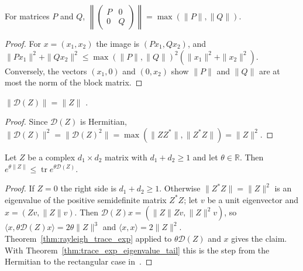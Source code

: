 \begin{theorem}
    \label{thm:block_diagonal_norm}
    \leanok
    For matrices $P$ and $Q$,
    $\left\|\begin{pmatrix}P&0\\0&Q\end{pmatrix}\right\|=\max(\|P\|,\|Q\|)$.
\end{theorem}
\begin{proof}\leanok
    For $x=(x_1,x_2)$ the image is $(Px_1,Qx_2)$, and
    $\|Px_1\|^{2}+\|Qx_2\|^{2}\le\max(\|P\|,\|Q\|)^{2}(\|x_1\|^{2}+\|x_2\|^{2})$.
    Conversely, the vectors $(x_1,0)$ and $(0,x_2)$ show $\|P\|$ and $\|Q\|$
    are at most the norm of the block matrix.
\end{proof}

\begin{theorem}
    \label{thm:hermitian_dilation_norm}
    \leanok
    $\|\mathcal{D}(Z)\|=\|Z\|$ \cite[Equation~(2.12)]{Tropp2012User}.
\end{theorem}
\begin{proof}\leanok
    Since $\mathcal{D}(Z)$ is Hermitian,
    $\|\mathcal{D}(Z)\|^{2}=\|\mathcal{D}(Z)^{2}\|=\max(\|ZZ^{*}\|,\|Z^{*}Z\|)
        =\|Z\|^{2}$.
\end{proof}

\begin{theorem}
    \label{thm:hermitian_dilation_trace_exp}
    \leanok
    Let $Z$ be a complex $d_1\times d_2$ matrix with $d_1+d_2\ge1$ and let
    $\theta\in\mathbb{R}$. Then
    $e^{\theta\|Z\|}\le\operatorname{tr}e^{\theta\mathcal{D}(Z)}$.
\end{theorem}
\begin{proof}\leanok
    If $Z=0$ the right side is $d_1+d_2\ge1$. Otherwise $\|Z^{*}Z\|=\|Z\|^{2}$ is
    an eigenvalue of the positive semidefinite matrix $Z^{*}Z$; let $v$ be a unit
    eigenvector and $x=(Zv,\|Z\|v)$. Then
    $\mathcal{D}(Z)x=(\|Z\|Zv,\|Z\|^{2}v)$, so
    $\langle x,\theta\mathcal{D}(Z)x\rangle=2\theta\|Z\|^{3}$ and
    $\langle x,x\rangle=2\|Z\|^{2}$. Theorem~\ref{thm:rayleigh_trace_exp} applied
    to $\theta\mathcal{D}(Z)$ and $x$ gives the claim. With
    Theorem~\ref{thm:trace_exp_eigenvalue_tail} this is the step from the
    Hermitian to the rectangular case in~\cite[Theorem~1.6]{Tropp2012User}.
\end{proof}
